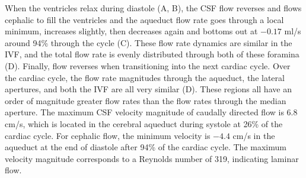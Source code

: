 \documentclass{template}
\begin{document}
When the ventricles relax during diastole (A, B),
the CSF flow reverses and flows cephalic to fill the ventricles
and the aqueduct flow rate goes through a local minimum, increases slightly,
then decreases again and bottoms out at $-0.17$ ml/s around
94\% through the cycle (C).
These flow rate dynamics are similar in the IVF,
and the total flow rate is evenly distributed through both of these foramina
(D).
Finally, flow reverses when transitioning 
into the next cardiac cycle. Over the cardiac cycle,
the flow rate magnitudes through the aqueduct,
the lateral apertures, and both the IVF
are all very similar (D).
These regions all have an order of magnitude greater
flow rates than the flow rates through the median aperture.
The maximum CSF velocity magnitude of caudally directed flow is 6.8 cm/s,
which is located in the cerebral aqueduct during systole at 26\% of the cardiac cycle.
For cephalic flow, the minimum velocity is $-4.4$ cm/s in the aqueduct at the end of diastole
after 94\% of the cardiac cycle. The maximum velocity magnitude corresponds to
a Reynolds number of 319, indicating laminar flow.
\end{document}
